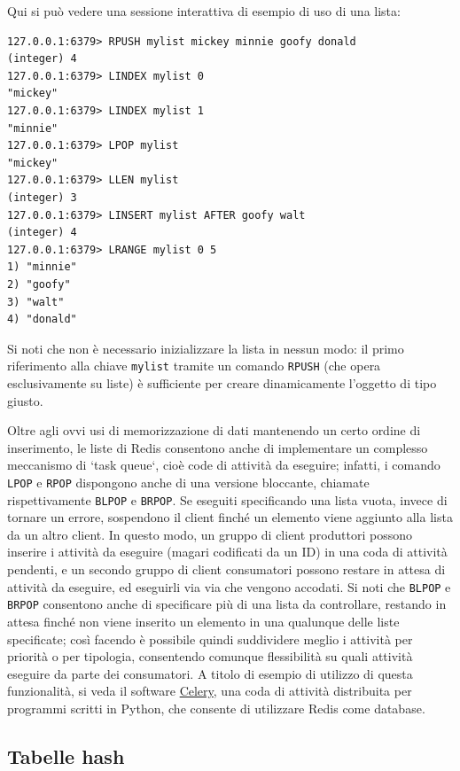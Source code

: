 Qui si può vedere una sessione interattiva di esempio di uso di una lista:

\medskip
\begin{lstlisting}
127.0.0.1:6379> RPUSH mylist mickey minnie goofy donald
(integer) 4
127.0.0.1:6379> LINDEX mylist 0
"mickey"
127.0.0.1:6379> LINDEX mylist 1
"minnie"
127.0.0.1:6379> LPOP mylist
"mickey"
127.0.0.1:6379> LLEN mylist
(integer) 3
127.0.0.1:6379> LINSERT mylist AFTER goofy walt
(integer) 4
127.0.0.1:6379> LRANGE mylist 0 5
1) "minnie"
2) "goofy"
3) "walt"
4) "donald"
\end{lstlisting}

Si noti che non è necessario inizializzare la lista in nessun modo: il primo riferimento alla chiave
\verb|mylist| tramite un comando \verb|RPUSH| (che opera esclusivamente su liste) è sufficiente
per creare dinamicamente l'oggetto di tipo giusto.

Oltre agli ovvi usi di memorizzazione di dati mantenendo un certo ordine di inserimento, le liste di
Redis consentono anche di implementare un complesso meccanismo di `task queue`, cioè code di
attività da eseguire; infatti, i comando \verb|LPOP| e \verb|RPOP| dispongono anche di una versione
bloccante, chiamate rispettivamente \verb|BLPOP| e \verb|BRPOP|. Se eseguiti specificando una lista
vuota, invece di tornare un errore, sospendono il client finché un elemento viene aggiunto alla
lista da un altro client. In questo modo, un gruppo di client produttori possono inserire i attività
da eseguire (magari codificati da un ID) in una coda di attività pendenti, e un secondo gruppo di
client consumatori possono restare in attesa di attività da eseguire, ed eseguirli via via che
vengono accodati. Si noti che \verb|BLPOP| e \verb|BRPOP| consentono anche di specificare più di una
lista da controllare, restando in attesa finché non viene inserito un elemento in una qualunque
delle liste specificate; così facendo è possibile quindi suddividere meglio i attività per priorità
o per tipologia, consentendo comunque flessibilità su quali attività eseguire da parte dei
consumatori. A titolo di esempio di utilizzo di questa funzionalità, si veda il software
\href{http://celery.readthedocs.io/en/latest/}{Celery}, una coda di attività distribuita per
programmi scritti in Python, che consente di utilizzare Redis come database.


\subsection{Tabelle hash}

